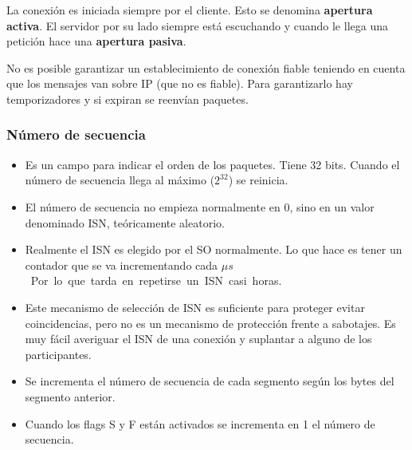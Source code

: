 La conexión es iniciada siempre por el cliente. Esto se denomina \textbf{apertura activa}. El servidor por su lado siempre está escuchando y cuando le llega una petición hace una \textbf{apertura pasiva}.

\begin{observacion}
    No es posible garantizar un establecimiento de conexión fiable teniendo en cuenta que los mensajes van sobre IP (que no es fiable). Para garantizarlo hay temporizadores y si expiran se reenvían paquetes. 
\end{observacion}

\subsubsection{Número de secuencia}
\begin{itemize}
    \item Es un campo para indicar el orden de los paquetes. Tiene 32 bits. Cuando el número de secuencia llega al máximo ($2^{32}$) se reinicia.
    \item El número de secuencia no empieza normalmente en 0, sino en un valor denominado \acrfull{ISN}, teóricamente aleatorio.
    \item Realmente el ISN es elegido por el SO normalmente. Lo que hace es tener un contador que se va incrementando cada \unit[4]{$\mu s$}. Por lo que tarda en repetirse un ISN casi \unit[5]{horas}.
    \item Este mecanismo de selección de ISN es suficiente para proteger evitar coincidencias, pero no es un mecanismo de protección frente a sabotajes. Es muy fácil averiguar el ISN de una conexión y suplantar a alguno de los participantes.
    \item Se incrementa el número de secuencia de cada segmento según los bytes del segmento anterior. 
    \item Cuando los flags S y F están activados se incrementa en 1 el número de secuencia.
\end{itemize}

